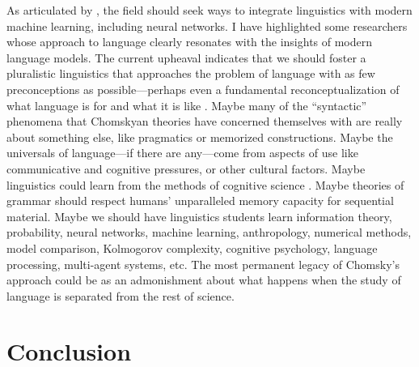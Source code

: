 \documentclass[output=paper,colorlinks,citecolor=brown
]{langscibook}
\begin{document}
As articulated by \cite{pater2019generative}, the field should seek ways to integrate linguistics with modern machine learning, including neural networks. I have highlighted some researchers whose approach to language clearly resonates with the insights of modern language models. The current upheaval indicates that we should foster a pluralistic linguistics that approaches the problem of language with as few preconceptions as possible---perhaps even a fundamental reconceptualization of what language is for and what it is like \citep{edelman2019verbal}. Maybe many of the ``syntactic'' phenomena that Chomskyan theories have concerned themselves with are really about something else, like pragmatics or memorized constructions. Maybe the universals of language---if there are any---come from aspects of use like communicative and cognitive pressures, or other cultural factors. Maybe linguistics could learn from the methods of cognitive science \citep{edelman2007bridging}. Maybe theories of grammar should respect humans' unparalleled memory capacity for sequential material. Maybe we should have linguistics students learn information theory, probability, neural networks, machine learning, anthropology, numerical methods, model comparison, Kolmogorov complexity, cognitive psychology, language processing, multi-agent systems, etc. The most permanent legacy of Chomsky's approach could be as an admonishment about what happens when the study of language is separated from the rest of science. 
\section*{Conclusion}
\end{document}
